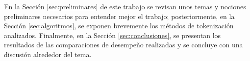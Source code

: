 En la Sección \ref{sec:preliminares} de este trabajo se revisan unos temas y
nociones preliminares necesarios para entender mejor el trabajo; posteriormente,
en la Sección \ref{sec:algoritmos}, se exponen brevemente los métodos de
tokenización analizados. Finalmente, en la Sección \ref{sec:conclusiones}, se
presentan los resultados de las comparaciones de desempeño realizadas y se
concluye con una discusión alrededor del tema.



